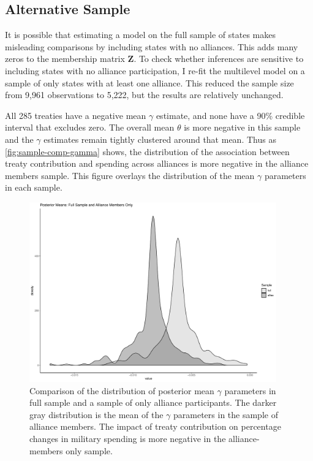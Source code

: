 \documentclass[12pt]{article}
\begin{document}
\subsection{Alternative Sample} 


It is possible that estimating a model on the full sample of states makes misleading comparisons by including states with no alliances.
This adds many zeros to the membership matrix \textbf{Z}. 
To check whether inferences are sensitive to including states with no alliance participation, I re-fit the multilevel model on a sample of only states with at least one alliance. 
This reduced the sample size from 9,961 observations to 5,222, but the results are relatively unchanged. 


All 285 treaties have a negative mean $\gamma$ estimate, and none have a 90\% credible interval that excludes zero.
The overall mean $\theta$ is more negative in this sample and the $\gamma$ estimates remain tightly clustered around that mean. 
Thus as \autoref{fig:sample-comp-gamma} shows, the distribution of the association between treaty contribution and spending across alliances is more negative in the alliance members sample. 
This figure overlays the distribution of the mean $\gamma$ parameters in each sample. 


\begin{figure}
	\centering
		\includegraphics[width=0.95\textwidth]{sample-comp-gamma.pdf}
	\caption{Comparison of the distribution of posterior mean $\gamma$ parameters in full sample and a sample of only alliance participants. The darker gray distribution is the mean of the $\gamma$ parameters in the sample of alliance members. The impact of treaty contribution on percentage changes in military spending is more negative in the alliance-members only sample.}
	\label{fig:sample-comp-gamma}
\end{figure}
\end{document}
